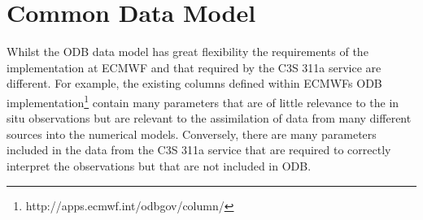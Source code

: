 \documentclass[a4paper]{article}
\begin{document}
\section {Common Data Model}
\FloatBarrier
Whilst the ODB data model has great flexibility the requirements of the implementation at ECMWF and that required by the C3S 311a service are different. For example, the existing columns defined within ECMWFs ODB implementation\footnote{http://apps.ecmwf.int/odbgov/column/}  contain many parameters that are of little relevance to the in situ observations but are relevant to the assimilation of data from many different sources into the numerical models. Conversely, there are many parameters included in the data from the C3S 311a service that are required to correctly interpret the observations but that are not included in ODB. \\
\end{document}
